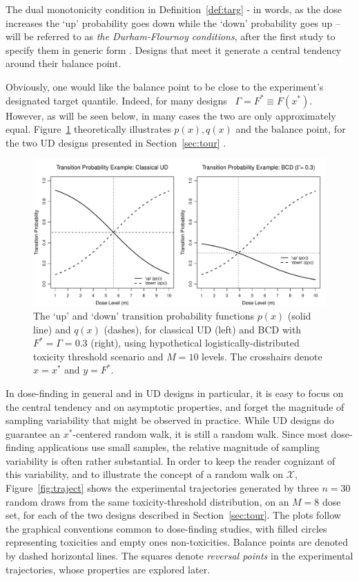 The dual monotonicity condition in Definition~\ref{def:targ} - in words, as the dose increases the `up' probability goes down while the `down' probability goes up --  will be referred to as \emph{the Durham-Flournoy conditions}, after the first study to specify them in generic form \citep{Durh:Flou:up-a:1995}. Designs that meet it generate a central tendency around their balance point. 

Obviously, one would like the balance point to be close to the experiment's designated target quantile. Indeed, for many designs \  $\Gamma=F^*\equiv F(x^*)$. However, as will be seen below, in many cases the two are only approximately equal. Figure~\ref{fig:pq} theoretically illustrates $p(x),q(x)$ and the balance point, for the two UD designs presented in Section~\ref{sec:tour} .

\begin{figure}
\begin{center}
\includegraphics[scale=0.55]{pqfig}
\caption{The `up' and `down' transition probability functions $p(x)$ (solid line) and $q(x)$ (dashes), for classical UD (left) and BCD with $F^*=\Gamma=0.3$ (right), using hypothetical logistically-distributed toxicity threshold scenario and $M=10$ levels. The crosshairs denote $x=x^*$ and $y=F^*$.}\label{fig:pq}
\end{center}
\end{figure}

In dose-finding in general and in UD designs in particular, it is easy to focus on the central tendency and on asymptotic properties, and forget the magnitude of sampling variability that might be observed in practice. While UD designs do guarantee an $x^*$-centered random walk, it is still a random walk. Since most dose-finding applications use small samples, the relative magnitude of sampling variability is often rather substantial. In order to keep the reader cognizant of this variability, and to illustrate the concept of a random walk on $\mathcal{X}$, Figure~\ref{fig:traject} shows the experimental trajectories generated by three $n=30$ random draws from the same toxicity-threshold distribution, on an $M=8$ dose set, for each of the two designs described in Section~\ref{sec:tour}. The plots follow the graphical conventions common to dose-finding studies, with filled circles representing toxicities and empty ones non-toxicities. Balance points are denoted by dashed horizontal lines. The squares denote \emph{reversal points} in the experimental trajectories, whose properties are explored later.

